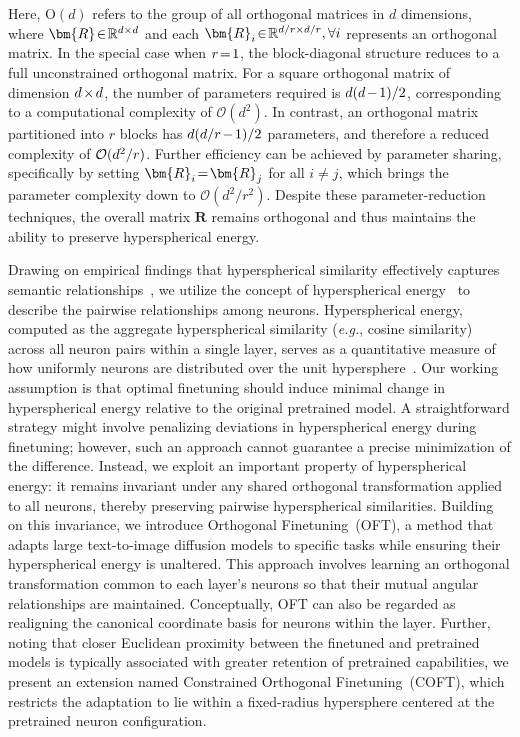Here, $\text{O}(d)$ refers to the group of all orthogonal matrices in $d$ dimensions, where $\thickmuskip=2mu \medmuskip=2mu \bm{R}\in\mathbb{R}^{d\times d}$ and each $\thickmuskip=2mu \medmuskip=2mu \bm{R}_i\in\mathbb{R}^{d/r\times d/r},\forall i$ represents an orthogonal matrix. In the special case when $\thickmuskip=2mu \medmuskip=2mu r=1$, the block-diagonal structure reduces to a full unconstrained orthogonal matrix. For a square orthogonal matrix of dimension $\thickmuskip=2mu \medmuskip=2mu d\times d$, the number of parameters required is $\thickmuskip=2mu \medmuskip=2mu d(d-1)/2$, corresponding to a computational complexity of $\mathcal{O}(d^2)$. In contrast, an orthogonal matrix partitioned into $r$ blocks has $\thickmuskip=2mu \medmuskip=2mu d(d/r-1)/2$ parameters, and therefore a reduced complexity of $\thickmuskip=2mu \medmuskip=2mu \mathcal{O}(d^2/r)$. Further efficiency can be achieved by parameter sharing, specifically by setting $\thickmuskip=2mu \medmuskip=2mu \bm{R}_i = \bm{R}_j$ for all $i \neq j$, which brings the parameter complexity down to $\mathcal{O}(d^2/r^2)$. Despite these parameter-reduction techniques, the overall matrix $\bm{R}$ remains orthogonal and thus maintains the ability to preserve hyperspherical energy.

Drawing on empirical findings that hyperspherical similarity effectively captures semantic relationships~\cite{liu2017deep,liu2018decoupled,chen2020angular}, we utilize the concept of hyperspherical energy~\cite{liu2018learning} to describe the pairwise relationships among neurons. Hyperspherical energy, computed as the aggregate hyperspherical similarity (\emph{e.g.}, cosine similarity) across all neuron pairs within a single layer, serves as a quantitative measure of how uniformly neurons are distributed over the unit hypersphere~\cite{liu2021learning}. Our working assumption is that optimal finetuning should induce minimal change in hyperspherical energy relative to the original pretrained model. A straightforward strategy might involve penalizing deviations in hyperspherical energy during finetuning; however, such an approach cannot guarantee a precise minimization of the difference. Instead, we exploit an important property of hyperspherical energy: it remains invariant under any shared orthogonal transformation applied to all neurons, thereby preserving pairwise hyperspherical similarities. Building on this invariance, we introduce Orthogonal Finetuning~(OFT), a method that adapts large text-to-image diffusion models to specific tasks while ensuring their hyperspherical energy is unaltered. This approach involves learning an orthogonal transformation common to each layer’s neurons so that their mutual angular relationships are maintained. Conceptually, OFT can also be regarded as realigning the canonical coordinate basis for neurons within the layer. Further, noting that closer Euclidean proximity between the finetuned and pretrained models is typically associated with greater retention of pretrained capabilities, we present an extension named Constrained Orthogonal Finetuning~(COFT), which restricts the adaptation to lie within a fixed-radius hypersphere centered at the pretrained neuron configuration.

